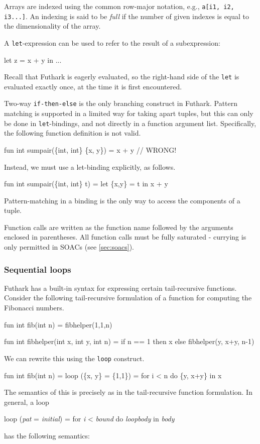 \documentclass[oneside]{memoir}
\begin{document}
Arrays are indexed using the common row-major notation, e.g.,
\texttt{a[i1, i2, i3...]}.  An indexing is said to be \textit{full} if
the number of given indexes is equal to the dimensionality of the
array.

A \texttt{let}-expression can be used to refer to the result of a
subexpression:
\begin{colorcode}
  let z = x + y in ...
\end{colorcode}
Recall that Futhark is eagerly evaluated, so the right-hand side of the
\texttt{let} is evaluated exactly once, at the time it is first
encountered.

Two-way \texttt{if-then-else} is the only branching construct in Futhark.
Pattern matching is supported in a limited way for taking apart
tuples, but this can only be done in \texttt{let}-bindings, and not
directly in a function argument list.  Specifically, the following
function definition is not valid.
\begin{colorcode}
  fun int sumpair(\{int, int\} \{x, y\}) = x + y // WRONG!
\end{colorcode}
Instead, we must use a let-binding explicitly, as follows.
\begin{colorcode}
  fun int sumpair(\{int, int\} t) =
    let \{x,y\} = t in x + y
\end{colorcode}
Pattern-matching in a binding is the only way to access the components
of a tuple.

Function calls are written as the function name followed by the
arguments enclosed in parentheses.  All function calls must be fully
saturated - currying is only permitted in SOACs (see
\cref{sec:soacs}).

\subsubsection{Sequential loops}
\label{sec:sequential-loops}

Futhark has a built-in syntax for expressing certain tail-recursive
functions.  Consider the following tail-recursive formulation of a
function for computing the Fibonacci numbers.
\begin{colorcode}
  fun int fib(int n) = fibhelper(1,1,n)

  fun int fibhelper(int x, int y, int n) =
    if n == 1 then x else fibhelper(y, x+y, n-1)
\end{colorcode}
We can rewrite this using the \texttt{loop} construct.
\begin{colorcode}
  fun int fib(int n) =
    loop (\{x, y\} = \{1,1\}) = for i < n do
                              \{y, x+y\}
    in x
\end{colorcode}
The semantics of this is precisely as in the tail-recursive function
formulation.  In general, a loop
\begin{colorcode}
  loop (\emph{pat} = \emph{initial}) = for \emph{i} < \emph{bound} do \emph{loopbody}
  in \emph{body}
\end{colorcode}
has the following semantics:
\end{document}
